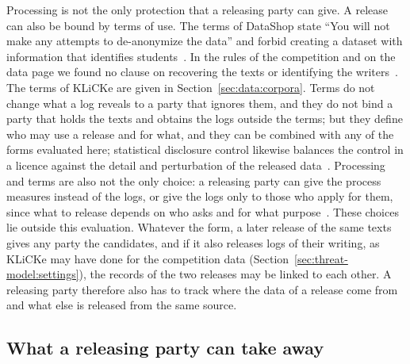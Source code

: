 Processing is not the only protection that a releasing party can give. A release can also be bound by terms of
use. The terms of DataShop state ``You will not make any attempts to
de-anonymize the data'' and forbid creating a dataset with information that identifies
students~\cite{datashop2012terms}. In the rules of the competition and on the data page we found no clause on
recovering the texts or identifying the writers~\cite{kaggle2023lwp}. The terms of KLiCKe are given in Section~\ref{sec:data:corpora}. Terms do not change
what a log reveals to a party that ignores them, and they do not bind a party that holds the texts and obtains the
logs outside the terms; but they define who may use a release and for what, and they can be combined with any of the
forms evaluated here; statistical disclosure control likewise balances the control in a licence against the
detail and perturbation of the released data~\cite{hundepool2026handbook}. Processing and terms are also not the only choice: a releasing party can give the process
measures instead of the logs, or give the logs only to those who apply for them, since what to release depends on who
asks and for what purpose~\cite{borgman2018open}. These choices lie outside this evaluation. Whatever the form, a
later release of the same texts gives any party the candidates, and if it also releases logs of their writing, as KLiCKe may have done
for the competition data (Section~\ref{sec:threat-model:settings}), the records of the two releases may be linked to
each other. A releasing party therefore
also has to track where the data of a release come from and what else is released from the same source.

\subsection{What a releasing party can take away}
\label{sec:discussion:takeaways}

